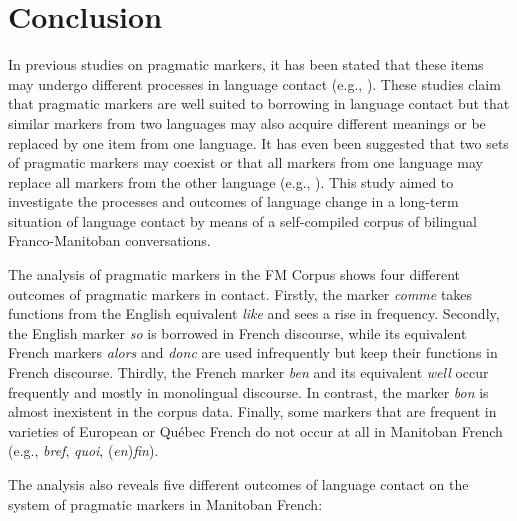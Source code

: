 \documentclass[output=paper]{langscibook}
\begin{document}
\section{Conclusion}
In previous studies on pragmatic markers, it has been stated that these items may undergo different processes in language contact (e.g., \citealt{Mougeon.1991,Torres.2008}). These studies claim that pragmatic markers are well suited to borrowing in language contact but that similar markers from two languages may also acquire different meanings or be replaced by one item from one language. It has even been suggested that two sets of pragmatic markers may coexist or that all markers from one language may replace all markers from the other language (e.g., \citealt{Brody.1987,Goss.2000}). This study aimed to investigate the processes and outcomes of language change in a long-term situation of language contact by means of a self-compiled corpus of bilingual Franco-Manitoban conversations. 

The analysis of pragmatic markers in the FM Corpus shows four different outcomes of pragmatic markers in contact. Firstly, the marker \textit{comme} takes functions from the English equivalent \textit{like} and sees a rise in frequency. Secondly, the English marker \textit{so} is borrowed in French discourse, while its equivalent French markers \textit{alors} and \textit{donc} are used infrequently but keep their functions in French discourse. Thirdly, the French marker \textit{ben} and its equivalent \textit{well} occur frequently and mostly in monolingual discourse. In contrast, the marker \textit{bon} is almost inexistent in the corpus data. Finally, some markers that are frequent in varieties of European or Québec French do not occur at all in Manitoban French 
(e.g., \textit{bref}, \textit{quoi}, (\textit{en})\textit{fin}). 

The analysis also reveals five different outcomes of language contact on the system of pragmatic markers in Manitoban French:
\end{document}
